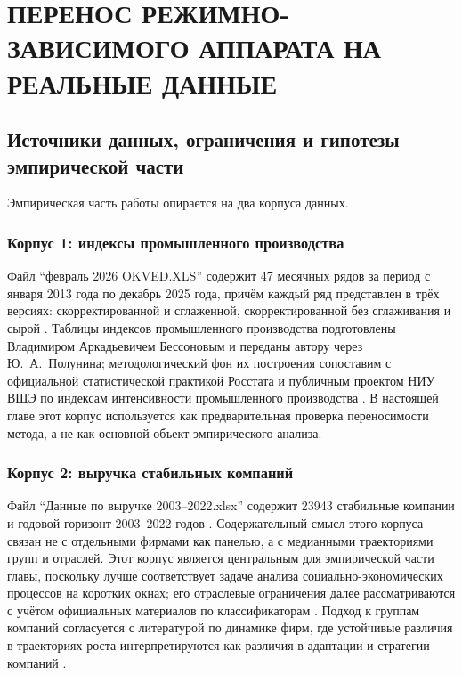 \chapter{ПЕРЕНОС РЕЖИМНО-ЗАВИСИМОГО АППАРАТА НА РЕАЛЬНЫЕ ДАННЫЕ}
\label{chap:perenos-rezhimno-zavisimogo-apparata-na-realnye-dannye}

\section{Источники данных, ограничения и гипотезы эмпирической части}
\label{sec:istochniki-dannyh-ogranicheniya-i-gipotezy-empiricheskoi-chasti}

Эмпирическая часть работы опирается на два корпуса данных.

\subsection{Корпус 1: индексы промышленного производства}
\label{sec:korpus-1-indeksy-promyshlennogo-proizvodstva}

Файл ``февраль 2026 OKVED.XLS'' содержит 47 месячных рядов за период с января 2013 года по декабрь 2025 года, причём каждый ряд представлен в трёх версиях: скорректированной и сглаженной, скорректированной без сглаживания и сырой \cite{data-okved-xls}. Таблицы индексов промышленного производства подготовлены Владимиром Аркадьевичем Бессоновым и переданы автору через Ю.~А.~Полунина; методологический фон их построения сопоставим с официальной статистической практикой Росстата и публичным проектом НИУ ВШЭ по индексам интенсивности промышленного производства \cite{rosstat-ipp,hse-iipp}. В настоящей главе этот корпус используется как предварительная проверка переносимости метода, а не как основной объект эмпирического анализа.

\subsection{Корпус 2: выручка стабильных компаний}
\label{sec:korpus-2-vyruchka-stabilnyh-kompanii}

Файл ``Данные по выручке 2003--2022.xlsx'' содержит 23943 стабильные компании и годовой горизонт 2003--2022 годов \cite{data-revenue-xlsx}. Содержательный смысл этого корпуса связан не с отдельными фирмами как панелью, а с медианными траекториями групп и отраслей. Этот корпус является центральным для эмпирической части главы, поскольку лучше соответствует задаче анализа социально-экономических процессов на коротких окнах; его отраслевые ограничения далее рассматриваются с учётом официальных материалов по классификаторам \cite{minec-okved,rosstat-okved}. Подход к группам компаний согласуется с литературой по динамике фирм, где устойчивые различия в траекториях роста интерпретируются как различия в адаптации и стратегии компаний \cite{coad,polunin-2019,polunin-yudanov-2020}.

